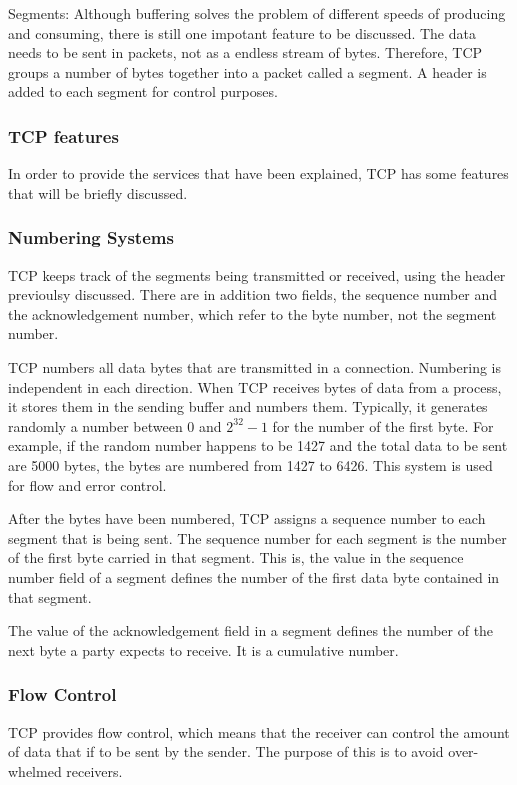 Segments: Although buffering solves the problem of different speeds of producing and consuming, there is still one impotant feature to be discussed. The data needs to be sent in packets, not as a endless stream of bytes. Therefore, TCP groups a number of bytes together into a packet called a segment. A header is added to each segment for control purposes. 

\subsubsection{TCP features}
In order to provide the services that have been explained, TCP has some features that will be briefly discussed.

\subsubsection*{Numbering Systems}
TCP keeps track of the segments being transmitted or received, using the header previoulsy discussed. 
There are in addition two fields, the sequence number and the acknowledgement number, which refer to the byte number, not the segment number.

TCP numbers all data bytes that are transmitted in a connection. Numbering is independent in each direction. When TCP receives bytes of data from a process, it stores them in the sending buffer and numbers them. Typically, it generates randomly a number between 0 and $2^{32}-1$ for the number of the first byte. For example, if the random number happens to be 1427 and the total data to be sent are 5000 bytes, the bytes are numbered from 1427 to 6426. This system is used for flow and error control.

After the bytes have been numbered, TCP assigns a sequence number to each segment that is being sent. The sequence number for each segment is the number of the first byte carried in that segment. This is, the value in the sequence number field of a segment defines the number of the first data byte contained in that segment. 

The value of the acknowledgement field in a segment defines the number of the next byte a party expects to receive. It is a cumulative number. 

\subsubsection*{Flow Control}
TCP provides flow control, which means that the receiver can control the amount of data that if to be sent by the sender. The purpose of this is to avoid over-whelmed receivers. 

